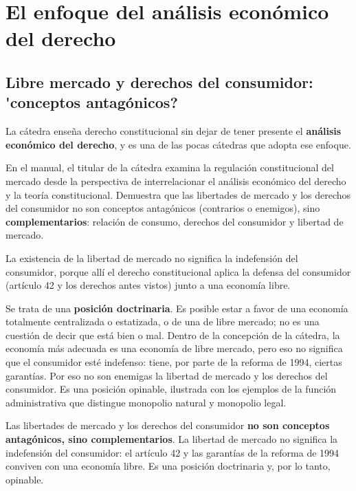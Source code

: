 \documentclass[12pt,oneside]{book}
\begin{document}
\chapter{El enfoque del an\'alisis econ\'omico del derecho}

\section{Libre mercado y derechos del consumidor: \texorpdfstring{\'{}}{}conceptos antag\'onicos?}

La c\'atedra ense\~na derecho constitucional sin dejar de tener presente el \textbf{an\'alisis econ\'omico del derecho}, y es una de las pocas c\'atedras que adopta ese enfoque.

En el manual, el titular de la c\'atedra examina la regulaci\'on constitucional del mercado desde la perspectiva de interrelacionar el an\'alisis econ\'omico del derecho y la teor\'ia constitucional. Demuestra que las libertades de mercado y los derechos del consumidor no son conceptos antag\'onicos (contrarios o enemigos), sino \textbf{complementarios}: relaci\'on de consumo, derechos del consumidor y libertad de mercado.

La existencia de la libertad de mercado no significa la indefensi\'on del consumidor, porque all\'i el derecho constitucional aplica la defensa del consumidor (art\'iculo 42 y los derechos antes vistos) junto a una econom\'ia libre.

Se trata de una \textbf{posici\'on doctrinaria}. Es posible estar a favor de una econom\'ia totalmente centralizada o estatizada, o de una de libre mercado; no es una cuesti\'on de decir que est\'a bien o mal. Dentro de la concepci\'on de la c\'atedra, la econom\'ia m\'as adecuada es una econom\'ia de libre mercado, pero eso no significa que el consumidor est\'e indefenso: tiene, por parte de la reforma de 1994, ciertas garant\'ias. Por eso no son enemigas la libertad de mercado y los derechos del consumidor. Es una posici\'on opinable, ilustrada con los ejemplos de la funci\'on administrativa que distingue monopolio natural y monopolio legal.

\begin{important}
Las libertades de mercado y los derechos del consumidor \textbf{no son conceptos antag\'onicos, sino complementarios}. La libertad de mercado no significa la indefensi\'on del consumidor: el art\'iculo 42 y las garant\'ias de la reforma de 1994 conviven con una econom\'ia libre. Es una posici\'on doctrinaria y, por lo tanto, opinable.
\end{important}
\end{document}
